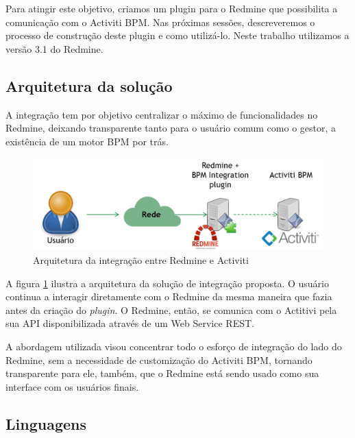 Para atingir este objetivo, criamos um plugin para o Redmine que possibilita a comunicação com o Activiti BPM. Nas próximas sessões, descreveremos o processo de construção deste plugin e como utilizá-lo. Neste trabalho utilizamos a versão 3.1 do Redmine\cite{redmine31}.

\subsection{Arquitetura da solução}\label{sec:integracao_redmine_activiti_implementacao-arquitetura}

A integração tem por objetivo centralizar o máximo de funcionalidades no Redmine, deixando transparente tanto para o usuário comum como o gestor, a existência de um motor BPM por trás.

\begin{figure}[H]
\centering
\includegraphics[width=1\textwidth]{imagens/arquitetura_desenvolvida_bpm_integration.png}
\caption{Arquitetura da integração entre Redmine e Activiti}
\label{fig:arquitetura_integracao_redmine_bpm}
\end{figure}

A figura \ref{fig:arquitetura_integracao_redmine_bpm} ilustra a arquitetura da solução de integração proposta. O usuário continua a interagir diretamente com o Redmine da mesma maneira que fazia antes da criação do \textit{plugin}. O Redmine, então, se comunica com o Actitivi pela sua API disponibilizada através de um Web Service REST.

A abordagem utilizada visou concentrar todo o esforço de integração do lado do Redmine, sem a necessidade de customização do Activiti BPM, tornando transparente para ele, também, que o Redmine está sendo usado como sua interface com os usuários finais.
    

\subsection{Linguagens}\label{sec:integracao_redmine_activiti_implementacao_detalhes_desenvolvimento_linguagens}


